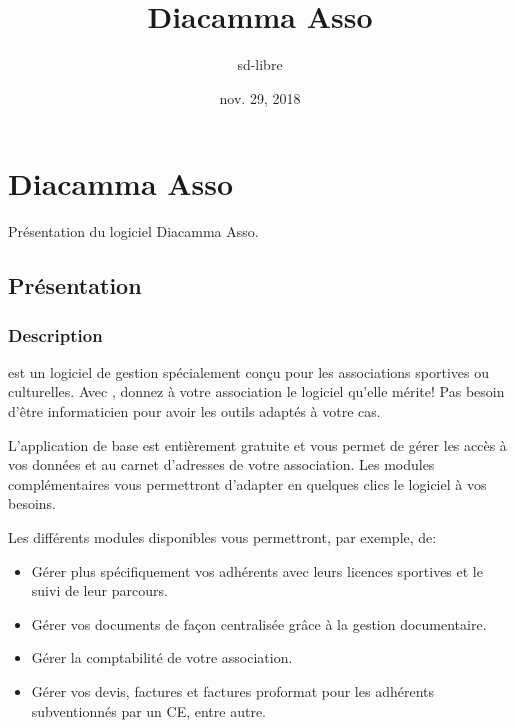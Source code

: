 \documentclass[a4paper,10pt,oneside,french]{sphinxmanual}
\title{Diacamma Asso}
\date{nov. 29, 2018}
\author{sd-libre}
\begin{document}
\maketitle
\sphinxtableofcontents
{}\label{\detokenize{index::doc}}



\chapter{Diacamma Asso}
\label{\detokenize{asso/index::doc}}\label{\detokenize{asso/index:diacamma-asso}}\label{\detokenize{asso/index:sommaire}}
Présentation du logiciel Diacamma Asso.


\section{Présentation}
\label{\detokenize{asso/presentation::doc}}\label{\detokenize{asso/presentation:presentation}}

\subsection{Description}
\label{\detokenize{asso/presentation:description}}
 est un logiciel de gestion spécialement conçu pour les associations sportives ou culturelles.
Avec , donnez à votre association le logiciel qu’elle mérite! Pas besoin d’être informaticien pour avoir les outils adaptés à votre cas.

L’application de base est entièrement gratuite et vous permet de gérer les accès à vos données et au carnet d’adresses de votre association. Les modules complémentaires vous permettront d’adapter en quelques clics le logiciel à vos besoins.

Les différents modules disponibles vous permettront, par exemple, de:
\begin{itemize}
\item {} 
Gérer plus spécifiquement vos adhérents avec leurs licences sportives et le suivi de leur parcours.

\item {} 
Gérer vos documents de façon centralisée grâce à la gestion documentaire.

\item {} 
Gérer la comptabilité de votre association.

\item {} 
Gérer vos devis, factures et factures proformat pour les adhérents subventionnés par un CE, entre autre.

\end{itemize}
\end{document}
